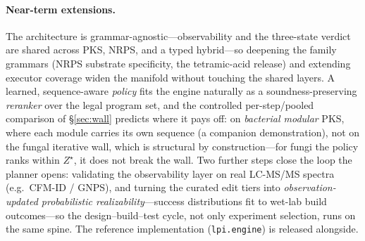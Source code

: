 \documentclass[11pt]{article}
\theoremstyle{definition}
\newcommand{\code}[1]{\texttt{#1}}
\begin{document}
\paragraph{Near-term extensions.} The architecture is grammar-agnostic---observability and the three-state
verdict are shared across PKS, NRPS, and a typed hybrid---so deepening the family grammars (NRPS substrate
specificity, the tetramic-acid release) and extending executor coverage widen the manifold without
touching the shared layers. A learned, sequence-aware \emph{policy} fits the engine naturally as a
soundness-preserving \emph{reranker} over the legal program set, and the controlled per-step/pooled
comparison of \S\ref{sec:wall} predicts where it pays off: on \emph{bacterial modular} PKS, where each
module carries its own sequence (a companion demonstration), not on the fungal iterative wall, which is
structural by construction---for fungi the policy ranks within $Z^{\star}$, it does not break the wall.
Two further steps close the loop the planner opens: validating the observability layer on real LC-MS/MS
spectra (e.g.\ CFM-ID / GNPS), and turning the curated edit tiers into \emph{observation-updated
probabilistic realizability}---success distributions fit to wet-lab build outcomes---so the
design--build--test cycle, not only experiment selection, runs on the same spine. The reference
implementation (\code{lpi.engine}) is released alongside.
\end{document}
